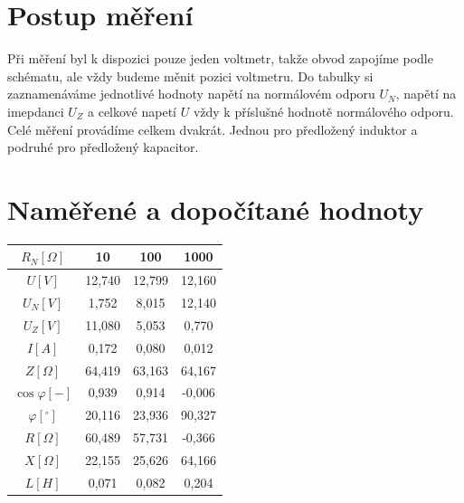\documentclass[12pt]{article} %
\begin{document}
\section{Postup měření}
Při měření byl k dispozici pouze jeden voltmetr, takže obvod zapojíme podle schématu, ale vždy budeme měnit pozici voltmetru. Do tabulky si zaznamenáváme jednotlivé hodnoty napětí na normálovém odporu $U_N$, napětí na imepdanci $U_Z$ a celkové  napetí $U$ vždy k příslušné hodnotě normálového odporu. Celé měření provádíme celkem dvakrát. Jednou pro předložený induktor a podruhé pro předložený kapacitor.

\section{Naměřené a dopočítané hodnoty}
\begin{tabular}{|c|c|c|c|}
\hline 
$R_N [\Omega]$ & 10 & 100 & 1000 \\ 
\hline 
$U [V]$ & 12,740 & 12,799 & 12,160 \\ 
\hline 
$U_N [V]$ & 1,752 & 8,015 & 12,140 \\ 
\hline 
$U_Z [V]$ & 11,080 & 5,053 & 0,770 \\ 
\hline 
$I [A]$ & 0,172 & 0,080 & 0,012 \\ 
\hline 
$Z [\Omega]$ & 64,419 & 63,163 & 64,167 \\ 
\hline 
$\cos \varphi [-]$ & 0,939 & 0,914 & -0,006 \\ 
\hline 
$\varphi [^{\circ}]$ & 20,116 & 23,936 & 90,327 \\ 
\hline 
$R [\Omega]$ & 60,489 & 57,731 & -0,366 \\ 
\hline 
$X [\Omega]$ & 22,155 & 25,626 & 64,166 \\ 
\hline 
$L [H]$ & 0,071 & 0,082 & 0,204 \\ 
\hline 
\end{tabular} \\\\
\end{document}
